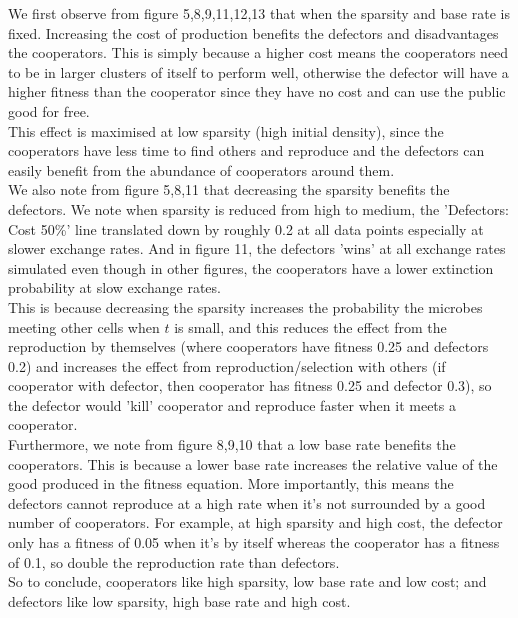 \documentclass[11pt]{article}
\begin{document}
\noindent We first observe from figure 5,8,9,11,12,13 that when the sparsity and base rate is fixed. Increasing the cost of production benefits the defectors and disadvantages the cooperators. This is simply because a higher cost means the cooperators need to be in larger clusters of itself to perform well, otherwise the defector will have a higher fitness than the cooperator since they have no cost and can use the public good for free.\\
This effect is maximised at low sparsity (high initial density), since the cooperators have less time to find others and reproduce and the defectors can easily benefit from the abundance of cooperators around them.\\
We also note from figure 5,8,11 that decreasing the sparsity benefits the defectors. We note when sparsity is reduced from high to medium, the 'Defectors: Cost 50\%' line translated down by roughly 0.2 at all data points especially at slower exchange rates. And in figure 11, the defectors 'wins' at all exchange rates simulated even though in other figures, the cooperators have a lower extinction probability at slow exchange rates.\\
This is because decreasing the sparsity increases the probability the microbes meeting other cells when $t$ is small, and this reduces the effect from the reproduction by themselves (where cooperators have fitness 0.25 and defectors 0.2) and increases the effect from reproduction/selection with others (if cooperator with defector, then cooperator has fitness 0.25 and defector 0.3), so the defector would 'kill' cooperator and reproduce faster when it meets a cooperator.\\
Furthermore, we note from figure 8,9,10 that a low base rate benefits the cooperators. This is because a lower base rate increases the relative value of the good produced in the fitness equation. More importantly, this means the defectors cannot reproduce at a high rate when it's not surrounded by a good number of cooperators. For example, at high sparsity and high cost, the defector only has a fitness of 0.05 when it's by itself whereas the cooperator has a fitness of 0.1, so double the reproduction rate than defectors.\\
So to conclude, cooperators like high sparsity, low base rate and low cost; and defectors like low sparsity, high base rate and high cost.
\end{document}
